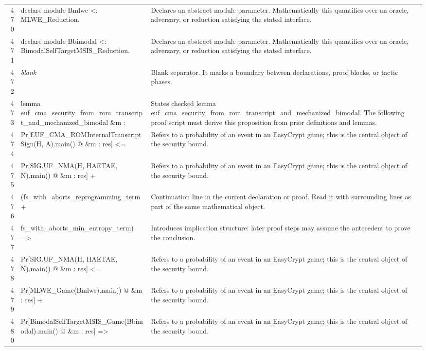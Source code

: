 \documentclass[10pt]{article}
\begin{document}
\begin{longtable}{r L{0.53\textwidth} L{0.37\textwidth}}
470 & {\ttfamily\scriptsize declare module Bmlwe <: MLWE\_Reduction.} & Declares an abstract module parameter.  Mathematically this quantifies over an oracle, adversary, or reduction satisfying the stated interface. \\
471 & {\ttfamily\scriptsize declare module Bbimodal <: BimodalSelfTargetMSIS\_Reduction.} & Declares an abstract module parameter.  Mathematically this quantifies over an oracle, adversary, or reduction satisfying the stated interface. \\
472 & {\ttfamily\scriptsize \emph{blank}} & Blank separator.  It marks a boundary between declarations, proof blocks, or tactic phases. \\
473 & {\ttfamily\scriptsize lemma euf\_cma\_security\_from\_rom\_transcript\_and\_mechanized\_bimodal \&m :} & States checked lemma euf\_cma\_security\_from\_rom\_transcript\_and\_mechanized\_bimodal.  The following proof script must derive this proposition from prior definitions and lemmas. \\
474 & {\ttfamily\scriptsize   Pr[EUF\_CMA\_ROMInternalTranscriptSign(H, A).main() @ \&m : res] <=} & Refers to a probability of an event in an EasyCrypt game; this is the central object of the security bound. \\
475 & {\ttfamily\scriptsize     Pr[SIG.UF\_NMA(H, HAETAE, N).main() @ \&m : res] +} & Refers to a probability of an event in an EasyCrypt game; this is the central object of the security bound. \\
476 & {\ttfamily\scriptsize     (fs\_with\_aborts\_reprogramming\_term +} & Continuation line in the current declaration or proof.  Read it with surrounding lines as part of the same mathematical object. \\
477 & {\ttfamily\scriptsize       fs\_with\_aborts\_min\_entropy\_term) =>} & Introduces implication structure: later proof steps may assume the antecedent to prove the conclusion. \\
478 & {\ttfamily\scriptsize   Pr[SIG.UF\_NMA(H, HAETAE, N).main() @ \&m : res] <=} & Refers to a probability of an event in an EasyCrypt game; this is the central object of the security bound. \\
479 & {\ttfamily\scriptsize     Pr[MLWE\_Game(Bmlwe).main() @ \&m : res] +} & Refers to a probability of an event in an EasyCrypt game; this is the central object of the security bound. \\
480 & {\ttfamily\scriptsize     Pr[BimodalSelfTargetMSIS\_Game(Bbimodal).main() @ \&m : res] =>} & Refers to a probability of an event in an EasyCrypt game; this is the central object of the security bound. \\

\end{longtable}
\end{document}
